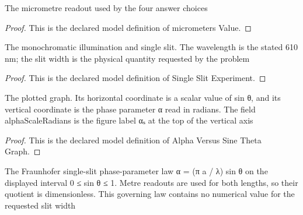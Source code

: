 \begin{definition}
  \label{def:physics:phyx-mini-0083:phyxminiproblems-problemphyxmini0083-micrometersvalue}
  The micrometre readout used by the four answer choices
\end{definition}
\begin{proof}
  This is the declared model definition of micrometers Value.
\end{proof}
\begin{definition}
  \label{def:physics:phyx-mini-0083:phyxminiproblems-problemphyxmini0083-singleslitexperiment}
  The monochromatic illumination and single slit. The wavelength is the stated 610 nm; the slit width is the physical quantity requested by the problem
\end{definition}
\begin{proof}
  This is the declared model definition of Single Slit Experiment.
\end{proof}
\begin{definition}
  \label{def:physics:phyx-mini-0083:phyxminiproblems-problemphyxmini0083-alphaversussinethetagraph}
  The plotted graph. Its horizontal coordinate is a scalar value of sin θ, and its vertical coordinate is the phase parameter α read in radians. The field alphaScaleRadians is the figure label αₛ at the top of the vertical axis
\end{definition}
\begin{proof}
  This is the declared model definition of Alpha Versus Sine Theta Graph.
\end{proof}
\begin{definition}
  \label{def:physics:phyx-mini-0083:phyxminiproblems-problemphyxmini0083-satisfiessingleslitphaselaw}
  The Fraunhofer single-slit phase-parameter law α = (π a / λ) sin θ on the displayed interval 0 ≤ sin θ ≤ 1. Metre readouts are used for both lengths, so their quotient is dimensionless. This governing law contains no numerical value for the requested slit width
\end{definition}
